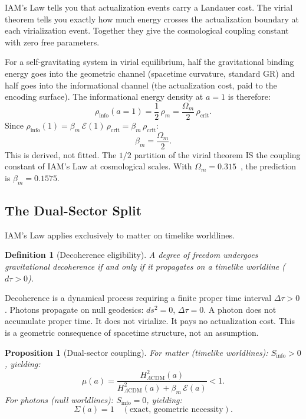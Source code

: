 \documentclass[12pt,a4paper]{article}
\newtheorem{proposition}{Proposition}
\newtheorem{definition}{Definition}
\begin{document}
IAM's Law tells you that actualization events carry a Landauer cost.
The virial theorem tells you exactly how much energy crosses the
actualization boundary at each virialization event. Together they
give the cosmological coupling constant with zero free parameters.

For a self-gravitating system in virial equilibrium, half the
gravitational binding energy goes into the geometric channel
(spacetime curvature, standard GR) and half goes into the
informational channel (the actualization cost, paid to the encoding
surface). The informational energy density at $a = 1$ is therefore:
\begin{equation}
\rho_\mathrm{info}(a{=}1) = \frac{1}{2}\,\rho_m
= \frac{\Omega_m}{2}\,\rho_\mathrm{crit}.
\end{equation}
Since $\rho_\mathrm{info}(1) = \beta_m\,\mathcal{E}(1)\,\rho_\mathrm{crit}
= \beta_m\,\rho_\mathrm{crit}$:
\begin{equation}
\boxed{\beta_m = \frac{\Omega_m}{2}.}
\label{eq:beta_derived}
\end{equation}
This is derived, not fitted. The $1/2$ partition of the virial theorem
IS the coupling constant of IAM's Law at cosmological scales. With
$\Omega_m = 0.315$~\citep{PlanckVI2020}, the prediction is
$\beta_m = 0.1575$.

\subsection{The Dual-Sector Split}

IAM's Law applies exclusively to matter on timelike worldlines.
\begin{definition}[Decoherence eligibility]
A degree of freedom undergoes gravitational decoherence if and only if
it propagates on a timelike worldline ($d\tau > 0$).
\end{definition}

Decoherence is a dynamical process requiring a finite proper time
interval $\Delta\tau > 0$. Photons propagate on null geodesics:
$ds^2 = 0$, $\Delta\tau = 0$. A photon does not accumulate proper
time. It does not virialize. It pays no actualization cost. This is
a geometric consequence of spacetime structure, not an assumption.

\begin{proposition}[Dual-sector coupling]
\label{prop:dual}
For matter (timelike worldlines): $S_\mathrm{info} > 0$, yielding:
\begin{equation}
\mu(a) = \frac{H^2_{\Lambda\mathrm{CDM}}(a)}
{H^2_{\Lambda\mathrm{CDM}}(a) + \beta_m\,\mathcal{E}(a)} < 1.
\label{eq:mu_exact}
\end{equation}
For photons (null worldlines): $S_\mathrm{info} = 0$, yielding:
\begin{equation}
\Sigma(a) = 1 \quad (\text{exact, geometric necessity}).
\label{eq:sigma_exact}
\end{equation}
\end{proposition}
\end{document}
